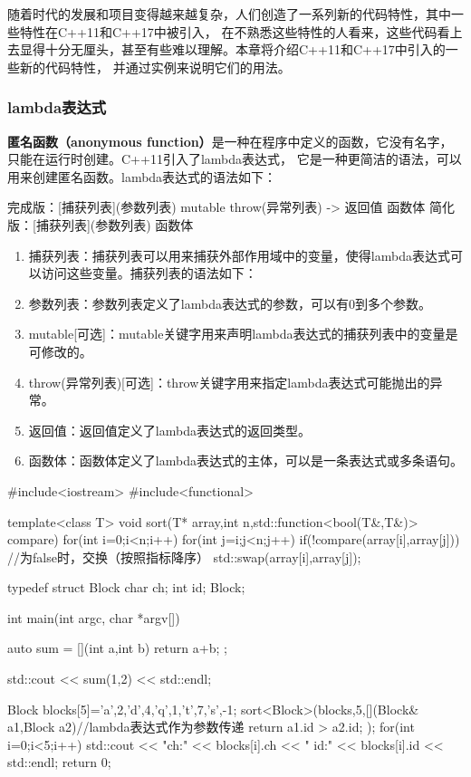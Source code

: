 随着时代的发展和项目变得越来越复杂，人们创造了一系列新的代码特性，其中一些特性在C++11和C++17中被引入，
在不熟悉这些特性的人看来，这些代码看上去显得十分无厘头，甚至有些难以理解。本章将介绍C++11和C++17中引入的一些新的代码特性，
并通过实例来说明它们的用法。
\subsubsection{lambda表达式}

\textbf{匿名函数（anonymous function）}是一种在程序中定义的函数，它没有名字，只能在运行时创建。C++11引入了lambda表达式，
它是一种更简洁的语法，可以用来创建匿名函数。lambda表达式的语法如下：

\begin{tcode}
完成版：[捕获列表](参数列表) mutable throw(异常列表) -> 返回值 {函数体}
简化版：[捕获列表](参数列表) {函数体}
\end{tcode}    

\begin{enumerate}
    \item 捕获列表：捕获列表可以用来捕获外部作用域中的变量，使得lambda表达式可以访问这些变量。捕获列表的语法如下：
    \item 参数列表：参数列表定义了lambda表达式的参数，可以有0到多个参数。
    \item mutable[可选]：mutable关键字用来声明lambda表达式的捕获列表中的变量是可修改的。
    \item throw(异常列表)[可选]：throw关键字用来指定lambda表达式可能抛出的异常。
    \item 返回值：返回值定义了lambda表达式的返回类型。
    \item 函数体：函数体定义了lambda表达式的主体，可以是一条表达式或多条语句。
\end{enumerate}

\begin{tcode}
#include<iostream>
#include<functional>

template<class T>
void sort(T* array,int n,std::function<bool(T&,T&)> compare){
    for(int i=0;i<n;i++){
        for(int j=i;j<n;j++){
            if(!compare(array[i],array[j])){    //为false时，交换（按照指标降序）
                std::swap(array[i],array[j]);
            }
        }
    }
}

typedef struct Block{
    char ch;
    int id;
}Block;

int main(int argc, char *argv[]) {
    auto sum = [](int a,int b){
        return a+b;
    };

    std::cout << sum(1,2) << std::endl;

    Block blocks[5]={{'a',2},{'d',4},{'q',1},{'t',7},{'s',-1}};
    sort<Block>(blocks,5,[](Block& a1,Block a2){//lambda表达式作为参数传递
        return a1.id > a2.id;
    });
    for(int i=0;i<5;i++){
        std::cout << "ch:" << blocks[i].ch << "  id:" << blocks[i].id << std::endl;
    }
    return 0;
}
\end{tcode}    

